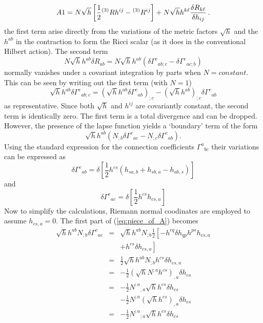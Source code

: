 \[
   A1 = N \sqrt{h} \left[ \frac{1}{2} {}^{(3)}R h^{ij} - {}^{(3)}R^{ij} \right]
        + N \sqrt{h} h^{k \ell} \frac{\delta R_{k \ell}}{\delta h_{ij}} \: .
\]
the first term arise directly from the variations of the metric factors $\sqrt{h}$
and the $h^{ab}$ in the contraction to form the Ricci scalar (as it does in
the conventional Hilbert action).
The second term
\[
  N \sqrt{h} h^{ab} \delta R_{ab} = N \sqrt{h} h^{ab}
                                   \left(
                                     \delta {\Gamma^c}_{ab;c} -
                                     \delta {\Gamma^c}_{ac;b}
                                   \right)
\]
normally vanishes under a covariant integration by parts when $N=constant$.  This can
be seen by writing out the first term (with $N=1$)
\[
  \sqrt{h} h^{ab} \delta {\Gamma^c}_{ab;c} = \left(
                                               \sqrt{h} h^{ab} \delta {\Gamma^c}_{ab}
                                             \right)_{;c} -
                                             \left(
                                               \sqrt{h} h^{ab}
                                             \right)_{;c} \delta {\Gamma^c}_{ab}
\]
as representative.
Since both $\sqrt{h}$ and $h^{ij}$ are covariantly constant, the second term is
identically zero.  The first term is a total divergence and can be dropped.
However, the presence of the lapse function yields a `boundary' term of the form
\begin{equation}\label{eq:piece_of_A}
   \sqrt{h} h^{ab} \left(   N_{;b} \delta {\Gamma ^c}_{ac}
                          - N_{;c} \delta {\Gamma ^c}_{ab} \right) .
\end{equation}
Using the standard expression for the connection coefficients
${\Gamma^a}_{bc}$ their variations can be expressed as
\[
   \delta {\Gamma^c}_{ab} = \delta \left[ \frac{1}{2} h^{cs}
                            \left( h_{sa,b} + h_{sb,a} - h_{ab,s} \right) \right]
\]
and \
\[
   \delta {\Gamma^c}_{ac} = \delta \left[ \frac{1}{2} h^{c s} h_{cs,a} \right]
\]
Now to simplify the calculations, Riemann normal coodinates are
employed to assume $h_{cs,a} = 0$.
The first part of
(\ref{eq:piece_of_A}) becomes
\begin{eqnarray}
\sqrt{h} h^{a b} N_{;b} \delta {\Gamma^c}_{ac}
& = & \sqrt{h} h^{a b} N_{;b} \frac{1}{2}
              \left[  -h^{c q} \delta h_{q p} h^{p s} h_{c s,a} \right. \nonumber \\
&   &         \left.  + h^{c s} \delta h_{c s,a} \right]
\nonumber \\
& = &    \frac{1}{2} \sqrt{h} h^{a b} N_{;b} h^{c s} \delta h_{c s, a}
\nonumber \\
& = &   -\frac{1}{2} \left( \sqrt{h} N^{;a} h^{c s} \right)_{,a} \delta h_{c s}
\nonumber \\
& = &   -\frac{1}{2} {N^{;a}}_{,a} \sqrt{h} h^{c s} \delta h_{c s}
\nonumber \\
&   &   - \frac{1}{2} N^{;a} \left( \sqrt{h} h^{c s} \right)_{,a}
\delta h_{c s}
\nonumber \\
& = &   -\frac{1}{2} {N^{;a}}_{;a} \sqrt{h} h^{c s} \delta h_{c s}
\end{eqnarray}
